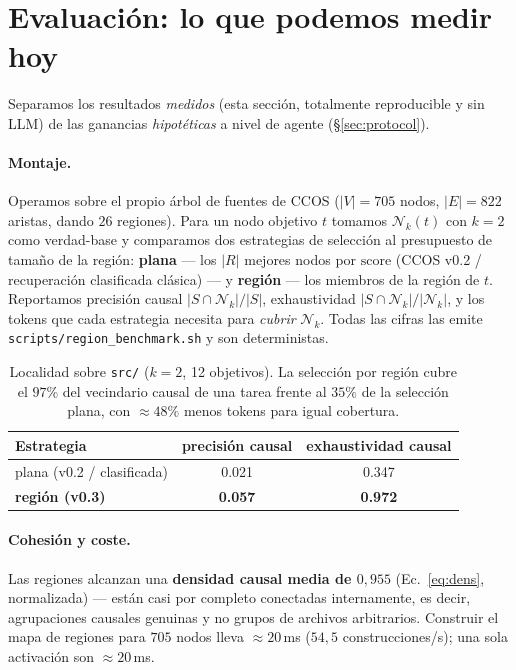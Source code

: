 \documentclass[11pt]{article}
\newcommand{\Nk}{\mathcal{N}_k}
\newcommand{\code}[1]{\texttt{#1}}
\begin{document}
\section{Evaluación: lo que podemos medir hoy}\label{sec:eval}

Separamos los resultados \emph{medidos} (esta sección, totalmente reproducible y sin
LLM) de las ganancias \emph{hipotéticas} a nivel de agente (\S\ref{sec:protocol}).

\paragraph{Montaje.} Operamos sobre el propio árbol de fuentes de CCOS ($|V|=705$
nodos, $|E|=822$ aristas, dando $26$ regiones). Para un nodo objetivo $t$ tomamos
$\Nk(t)$ con $k=2$ como verdad-base y comparamos dos estrategias de selección al
presupuesto de tamaño de la región: \textbf{plana} --- los $|R|$ mejores nodos por
$\mathrm{score}$ (CCOS v0.2 / recuperación clasificada clásica) --- y \textbf{región}
--- los miembros de la región de $t$. Reportamos precisión causal $|S\cap\Nk|/|S|$,
exhaustividad $|S\cap\Nk|/|\Nk|$, y los tokens que cada estrategia necesita para
\emph{cubrir} $\Nk$. Todas las cifras las emite \code{scripts/region\_benchmark.sh} y
son deterministas.

\begin{table}[h]
\centering
\begin{tabular}{lcc}
\toprule
Estrategia & precisión causal & exhaustividad causal \\
\midrule
plana (v0.2 / clasificada) & 0.021 & 0.347 \\
\textbf{región (v0.3)} & \textbf{0.057} & \textbf{0.972} \\
\bottomrule
\end{tabular}
\caption{Localidad sobre \code{src/} ($k=2$, 12 objetivos). La selección por región
cubre el $97\%$ del vecindario causal de una tarea frente al $35\%$ de la selección
plana, con $\approx\!48\%$ menos tokens para igual cobertura.}
\label{tab:locality}
\end{table}

\paragraph{Cohesión y coste.} Las regiones alcanzan una \textbf{densidad causal media
de $0{,}955$} (Ec.~\ref{eq:dens}, normalizada) --- están casi por completo conectadas
internamente, es decir, agrupaciones causales genuinas y no grupos de archivos
arbitrarios. Construir el mapa de regiones para $705$ nodos lleva $\approx\!20$\,ms
($54{,}5$ construcciones/s); una sola activación son $\approx\!20$\,ms.
\end{document}
